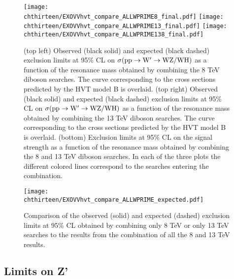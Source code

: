 \begin{figure}[htbp]
\centering
\texttt{[image: \\chthirteen/EXOVVhvt\_compare\_ALLWPRIME8\_final.pdf]}
\texttt{[image: \\chthirteen/EXOVVhvt\_compare\_ALLWPRIME13\_final.pdf]}
\texttt{[image: \\chthirteen/EXOVVhvt\_compare\_ALLWPRIME138\_final.pdf]}
\caption{%
(top left) Observed (black solid) and expected (black dashed) exclusion limits at 95\% CL on $\sigma( \rm pp \to \mathrm{W}^\prime \to WZ/WH)$ as a function of the resonance mass obtained by combining the 8 TeV diboson searches. The curve corresponding to the cross sections predicted by the HVT model B is overlaid. (top right) Observed (black solid) and expected (black dashed) exclusion limits at 95\% CL on $\sigma( \rm pp \to \mathrm{W}^\prime \to WZ/WH)$ as a function of the resonance mass obtained by combining the 13 TeV diboson searches. The curve corresponding to the cross sections predicted by the HVT model B is overlaid. (bottom) Exclusion limits at 95\% CL on the signal strength as a function of the resonance mass obtained by combining the 8 and 13 TeV diboson searches. In each of the three plots the different colored lines correspond to the searches entering the combination.}
\label{fig:wpall_138TeV}
\end{figure}

\begin{figure}[htbp]
\centering
\texttt{[image: \\chthirteen/EXOVVhvt\_compare\_ALLWPRIME\_expected.pdf]}
\caption{%
Comparison of the observed (solid) and expected (dashed) exclusion limits at 95\% CL obtained by combining only 8 TeV or only 13 TeV searches to the results from the combination of all the 8 and 13 TeV results.}
\label{fig:wpall_compare}
\end{figure}

\subsection{Limits on Z'}

